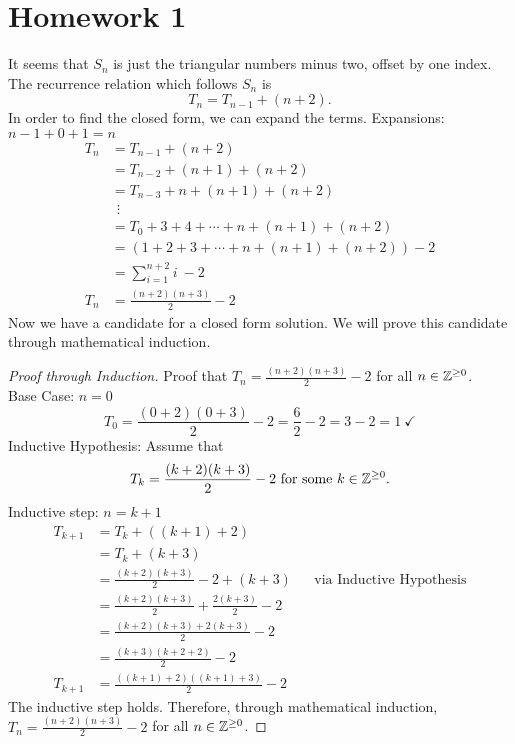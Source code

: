 \documentclass{article}
\newcommand{\assignment}{Homework 1}
\begin{document}
\section*{\assignment}

It seems that $S_n$ is just the triangular numbers minus two, offset by one index. The recurrence relation which follows $S_n$ is
\[
    T_n = T_{n-1} + (n+2).
\]
In order to find the closed form, we can expand the terms. Expansions: $n-1+0+1 = n$
\begin{align*}
    T_n & = T_{n-1} + (n+2)                              \\
        & = T_{n-2} + (n+1) + (n+2)                      \\
        & = T_{n-3} + n + (n+1) + (n+2)                  \\
        & ~~\vdots                                       \\
        & = T_{0} + 3 + 4 + \cdots + n + (n+1) + (n+2)   \\
        & = (1 + 2 + 3 + \cdots + n + (n+1) + (n+2)) - 2 \\
        & = \sum_{i=1}^{n+2} i ~- 2                      \\
    T_n & = \frac{(n+2)(n+3)}{2} - 2
\end{align*}
Now we have a candidate for a closed form solution. We will prove this candidate through mathematical induction.
\begin{proof}[Proof through Induction]
    Proof that $T_n = \frac{(n+2)(n+3)}{2} - 2$ for all $n \in \mathbb{Z}^{\geq 0}$. \\
    Base Case: $n = 0$
    \[
        T_0 = \frac{(0 + 2)(0 + 3)}{2} - 2 = \frac{6}{2} - 2 = 3 - 2 = 1~\checkmark
    \]
    Inductive Hypothesis: Assume that
    \[
        T_k = \frac{(k + 2)(k + 3)}{2} - 2~\text{for some}~k \in \mathbb{Z}^{\geq 0}.
    \]
    Inductive step: $n = k+1$
    \begin{align*}
        T_{k+1} & = T_k + ((k+1)+2)                                                                      \\
                & = T_k + (k+3)                                                                          \\
                & = \frac{(k + 2)(k + 3)}{2} - 2 + (k + 3)          &  & \text{via Inductive Hypothesis} \\
                & = \frac{(k + 2)(k + 3)}{2} + \frac{2(k+3)}{2} - 2                                      \\
                & = \frac{(k + 2)(k + 3) + 2(k+3)}{2} - 2                                                \\
                & = \frac{(k+3)(k+2+2)}{2} - 2                                                           \\
        T_{k+1} & = \frac{((k+1)+2)((k+1)+3)}{2} - 2
    \end{align*}
    The inductive step holds. Therefore, through mathematical induction, $T_n = \frac{(n+2)(n+3)}{2} - 2$ for all $n \in \mathbb{Z}^{\geq 0}$.
\end{proof}
\end{document}
